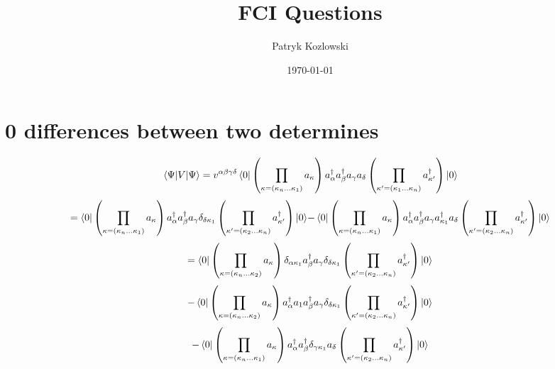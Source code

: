 \documentclass[12pt]{article}
\title{FCI Questions}
\author{Patryk Kozlowski}
\date{\today} %
\begin{document}
\maketitle
\section{0 differences between two determines}
\begin{equation}
    \mel{\Psi }{V}{\Psi }
    =v^{\alpha\beta\gamma\delta}\bra{0}\left(\prod_{\kappa=\left(\kappa_{n}\dots\kappa_{1}\right)}a_{\kappa}\right)
        a^{\dag}_{\alpha  }a^{\dag}_{\beta }a_{\gamma }a_{\delta }
    \left(\prod_{\kappa^{\prime}=\left(\kappa_{1}\dots\kappa_{n}\right)}a^{\dag}_{\kappa^{\prime}}\right)\ket{0}
\end{equation}
\begin{subequations}
    \begin{align}
        =\bra{0}\left(\prod_{\kappa=\left(\kappa_{n}\dots\kappa_{1}\right)}a_{\kappa}\right)
            a^{\dag}_{\alpha }a^{\dag}_{\beta }a_{\gamma }\delta _{\delta \kappa _{1}}
        \left(\prod_{\kappa^{\prime}=\left(\kappa_{2}\dots\kappa_{n}\right)}a^{\dag}_{\kappa^{\prime}}\right)\ket{0}
    \end{align}
    \begin{align}
        -\bra{0}\left(\prod_{\kappa=\left(\kappa_{n}\dots\kappa_{1}\right)}a_{\kappa}\right)
            a^{\dag}_{\alpha }a^{\dag}_{\beta }a_{\gamma }a^{\dag}_{\kappa _{1}}a_{\delta }
        \left(\prod_{\kappa^{\prime}=\left(\kappa_{2}\dots\kappa_{n}\right)}a^{\dag}_{\kappa^{\prime}}\right)\ket{0}
    \end{align}
\end{subequations}
\begin{equation}
    =\bra{0}\left(\prod_{\kappa=\left(\kappa_{n}\dots\kappa_{2}\right)}a_{\kappa}\right)
        \delta _{\alpha  \kappa _{1}}a^{\dag}_{\beta }a_{\gamma }\delta _{\delta  \kappa _{1}}
    \left(\prod_{\kappa^{\prime}=\left(\kappa_{2}\dots\kappa_{n}\right)}a^{\dag}_{\kappa^{\prime}}\right)\ket{0}
\end{equation}
\begin{equation}
    -\bra{0}\left(\prod_{\kappa=\left(\kappa_{n}\dots\kappa_{2}\right)}a_{\kappa}\right)
        a^{\dag}_{\alpha }a_{1}a^{\dag}_{\beta }a_{\gamma }\delta _{\delta  \kappa _{1}}
    \left(\prod_{\kappa^{\prime}=\left(\kappa_{2}\dots\kappa_{n}\right)}a^{\dag}_{\kappa^{\prime}}\right)\ket{0}
\end{equation}
\begin{equation}
    -\bra{0}\left(\prod_{\kappa=\left(\kappa_{n}\dots\kappa_{1}\right)}a_{\kappa}\right)
        a^{\dag}_{\alpha }a^{\dag}_{\beta }\delta _{\gamma  \kappa _{1}}a_{\delta }
    \left(\prod_{\kappa^{\prime}=\left(\kappa_{2}\dots\kappa_{n}\right)}a^{\dag}_{\kappa^{\prime}}\right)\ket{0}
\end{equation}
\end{document}
